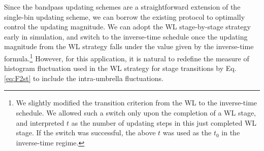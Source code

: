 \documentclass[preprint, superscriptaddress, floatfix]{revtex4-1}
\begin{document}
Since the bandpass updating schemes are a straightforward extension
of the single-bin updating scheme,
we can borrow the existing protocol\cite{belardinelli2007,
  *belardinelli2007jcp, *belardinelli2008, *belardinelli2016}
to optimally control the updating magnitude.
%
We can adopt the WL stage-by-stage strategy early in simulation,
and switch to the inverse-time schedule
once the updating magnitude from the WL strategy
falls under the value given by the inverse-time formula.\footnote{We
  slightly modified the transition criterion
  from the WL to the inverse-time schedule.
  We allowed such a switch only
  upon the completion of a WL stage,
  and interpreted $t$ as the number of updating steps
  in this just completed WL stage.
  If the switch was successful,
  the above $t$ was used as the $t_0$
  in the inverse-time regime.}
However, for this application,
it is natural to redefine the measure of histogram fluctuation
used in the WL strategy for stage transitions
by Eq. \eqref{eq:F2st}
to include the intra-umbrella fluctuations.
%
\end{document}
